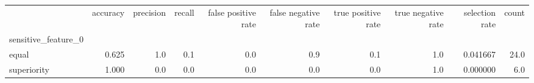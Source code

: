\begin{tabular}{lrrrrrrrrr}
\toprule
{} &  accuracy &  precision &  recall &  false positive rate &  false negative rate &  true positive rate &  true negative rate &  selection rate &  count \\
sensitive\_feature\_0 &           &            &         &                      &                      &                     &                     &                 &        \\
\midrule
equal               &     0.625 &        1.0 &     0.1 &                  0.0 &                  0.9 &                 0.1 &                 1.0 &        0.041667 &   24.0 \\
superiority         &     1.000 &        0.0 &     0.0 &                  0.0 &                  0.0 &                 0.0 &                 1.0 &        0.000000 &    6.0 \\
\bottomrule
\end{tabular}
